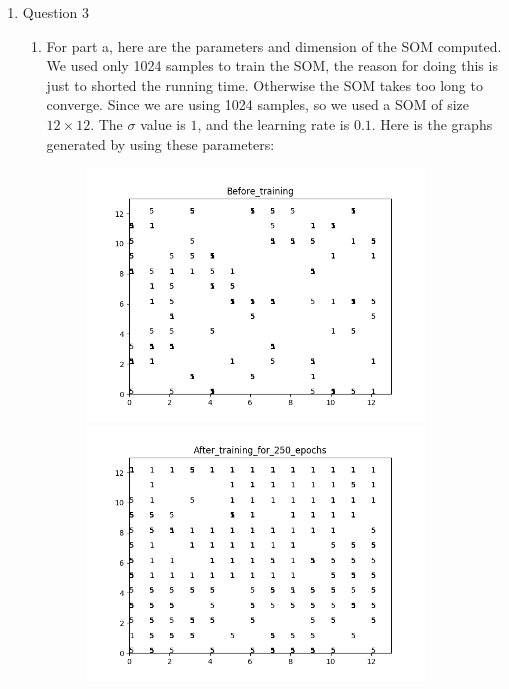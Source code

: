 \documentclass[11pt]{article}
\begin{document}
\begin{enumerate}
\begin{enumerate}
\end{enumerate}

\pagebreak

\item Question 3

\begin{enumerate}
\item For part a, here are the parameters and dimension of the SOM computed. We used only 1024 samples to train the SOM, the reason for doing this is just to shorted the running time. Otherwise the SOM takes too long to converge. Since we are using 1024 samples, so we used a SOM of size $12 \times 12$. The $\sigma$ value is $1$, and the learning rate is $0.1$. Here is the graphs generated by using these parameters:\\
\begin{figure}[h!]
    \centering
    \begin{minipage}{0.45\textwidth}
    	\centering
        \includegraphics[width=0.9\textwidth]{Before_training}
    \end{minipage}\hfill
    \begin{minipage}{0.45\textwidth}
    	\centering
         \includegraphics[width=0.9\textwidth]{After_training_for_250_epochs}

\end{minipage}
\end{figure}
\end{enumerate}
\end{enumerate}
\end{document}
